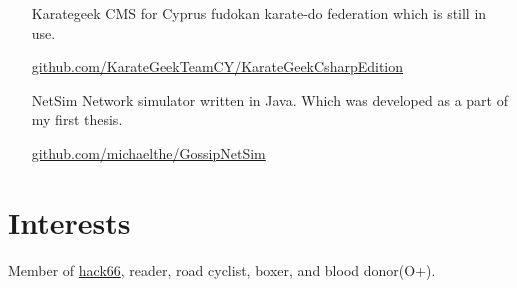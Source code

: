 \documentclass[margin, 10pt]{res} %
\begin{document}
\begin{resume}
\begin{itemize}
\item[Karategeek] CMS for Cyprus fudokan karate-do federation which is still in use.

\href{https://github.com/KarateGeekTeamCY/KarateGeekCsharpEdition/tree/baseV4.5.1}{github.com/KarateGeekTeamCY/KarateGeekCsharpEdition} \\

\item[NetSim] Network simulator written in Java.
Which was developed as a part of my first thesis.

\href{https://github.com/michaelthe/GossipNetSim}{github.com/michaelthe/GossipNetSim}

\end{itemize}

\section{Interests}

Member of \href{http://hack66.info/}{hack66}, reader, road cyclist, boxer, and blood donor(O+).

\end{resume}
\end{document}

